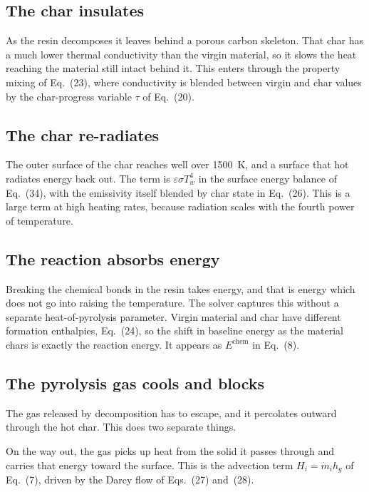 \documentclass[11pt]{article}
\begin{document}
\subsection*{The char insulates}

As the resin decomposes it leaves behind a porous carbon skeleton. That char has
a much lower thermal conductivity than the virgin material, so it slows the heat
reaching the material still intact behind it. This enters through the property
mixing of Eq.~(23), where conductivity is blended between virgin and char values
by the char-progress variable $\tau$ of Eq.~(20).

\subsection*{The char re-radiates}

The outer surface of the char reaches well over 1500~K, and a surface that hot
radiates energy back out. The term is $\varepsilon \sigma T_w^4$ in the surface
energy balance of Eq.~(34), with the emissivity itself blended by char state in
Eq.~(26). This is a large term at high heating rates, because radiation scales
with the fourth power of temperature.

\subsection*{The reaction absorbs energy}

Breaking the chemical bonds in the resin takes energy, and that is energy which
does not go into raising the temperature. The solver captures this without a
separate heat-of-pyrolysis parameter. Virgin material and char have different
formation enthalpies, Eq.~(24), so the shift in baseline energy as the material
chars is exactly the reaction energy. It appears as $E^{\mathrm{chem}}$ in
Eq.~(8).

\subsection*{The pyrolysis gas cools and blocks}

The gas released by decomposition has to escape, and it percolates outward
through the hot char. This does two separate things.

On the way out, the gas picks up heat from the solid it passes through and
carries that energy toward the surface. This is the advection term $H_i = \dot m_i
h_g$ of Eq.~(7), driven by the Darcy flow of Eqs.~(27) and~(28).
\end{document}
